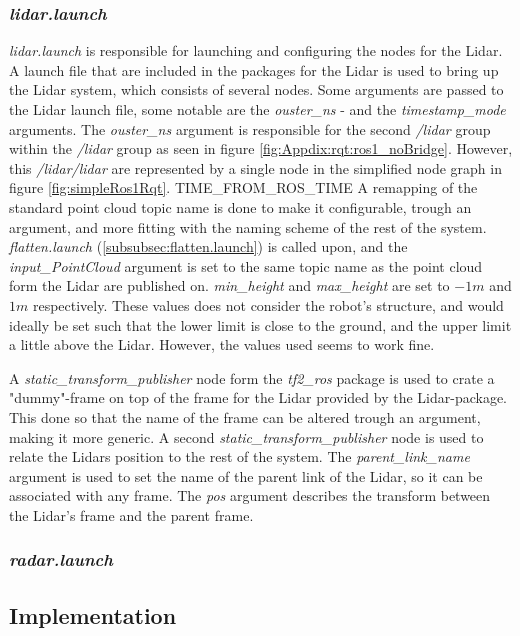 \subsubsection{\textit{lidar.launch}}
\textit{lidar.launch} is responsible for launching and configuring the nodes for the Lidar. A launch file that are included in the packages for the Lidar is used to bring up the Lidar system, which  consists of several nodes. Some arguments are passed to the Lidar launch file, some notable are the \textit{ouster\_ns} - and the  \textit{timestamp\_mode} arguments. The \textit{ouster\_ns} argument is responsible for the second \textit{/lidar} group within the \textit{/lidar} group as seen in figure \ref{fig:Appdix:rqt:ros1_noBridge}. However, this \textit{/lidar/lidar} are represented by a single node in the simplified node graph in figure \ref{fig:simpleRos1Rqt}. TIME\_FROM\_ROS\_TIME A remapping of the standard point cloud topic name is done to make it configurable, trough an argument, and more fitting with the naming scheme of the rest of the system. \textit{flatten.launch} (\ref{subsubsec:flatten.launch}) is called upon, and the \textit{input\_PointCloud} argument is set to the same topic name as the point cloud form the Lidar are published on. \textit{min\_height} and \textit{max\_height} are set to $-1 m$ and $1 m$ respectively. These values does not consider the robot's structure, and would ideally be set such that the lower limit is close to the ground, and the upper limit a little above the Lidar. However, the values used seems to work fine. 

A \textit{static\_transform\_publisher} node form the \textit{tf2\_ros} package is used to crate a "dummy"-frame on top of the frame for the Lidar provided by the Lidar-package. This done so that the name of the frame can be altered trough an argument, making it more generic. A second \textit{static\_transform\_publisher} node is used to relate the Lidars position to the rest of the system. The \textit{parent\_link\_name} argument is used to set the name of the parent link of the Lidar, so it can be associated with any frame. The \textit{pos} argument describes the transform between the Lidar's frame and the parent frame.

\subsubsection{\textit{radar.launch}}


\subsection{Implementation}




